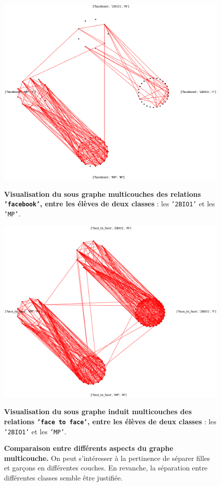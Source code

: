 \documentclass[11pt,a4paper]{article}
\theoremstyle{definition}
\theoremstyle{remark}
\theoremstyle{remark}
\begin{document}
\begin{figure}[h]
	\begin{minipage}[t]{0.48\textwidth}
		\captionsetup{margin=10pt}
		\includegraphics[width=\textwidth]{sousmulticlasse.png}
	\caption{\textbf{Visualisation du sous graphe multicouches des relations \texttt{'facebook'}, entre les élèves de deux classes} : les \texttt{'2BIO1'} et les \texttt{'MP'}.}
	\end{minipage}
	\begin{minipage}[t]{0.48\textwidth}
		\centering
		\includegraphics[width=\textwidth]{sousmulticlasseftf.png}
		\captionsetup{margin=10pt}
		\caption{\textbf{Visualisation du sous graphe induit multicouches des relations \texttt{'face to face'}, entre les élèves de deux classes} : les \texttt{'2BIO1'} et les \texttt{'MP'}.}
	\end{minipage}
	\label{induit}
	\caption{\textbf{Comparaison entre différents aspects du graphe multicouche. } On peut s'intéresser à la pertinence de séparer filles et garçons en différentes couches. En revanche, la séparation entre différentes classes semble être justifiée.}
\end{figure}
\end{document}
